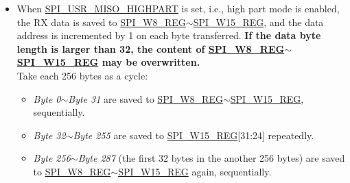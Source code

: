 \documentclass[main\_\_EN.tex]{subfiles}
\begin{document}
\begin{itemize}
\begin{itemize}
        \textbf{For instance:} to receive 258 bytes (\emph{Byte 0}$\sim$\emph{Byte 257}), the data is saved to the registers as follows:
        \begin{itemize}
            \item The first 64 bytes (\emph{Byte 0}$\sim$\emph{Byte 63}) are saved to \hyperref[regdesc:SPIW0REG]{SPI\_W0\_REG}$\sim$\hyperref[regdesc:SPIW15REG]{SPI\_W15\_REG}, sequentially.
            \item \emph{Byte 64}$\sim$\emph{Byte 255} are saved to \hyperref[regdesc:SPIW15REG]{SPI\_W15\_REG}[31:24] repeatedly.
            \item The other bytes (\emph{Byte 256} and \emph{Byte 257}) are saved to \hyperref[regdesc:SPIW0REG]{SPI\_W0\_REG}[7:0] and \hyperref[regdesc:SPIW0REG]{SPI\_W0\_REG}[15:8] again, sequentially. The logic is:
            \begin{itemize}
                \item The address to save \emph{Byte 256} is the result of (256 \% 64 = 0), i.e., \hyperref[regdesc:SPIW0REG]{SPI\_W0\_REG}[7:0].
                \item The address to save \emph{Byte 257} is the result of (257 \% 64 = 1), i.e., \hyperref[regdesc:SPIW0REG]{SPI\_W0\_REG}[15:8].
            \end{itemize}
        \end{itemize}
        
        \item When \hyperref[fielddesc:SPIUSRMISOHIGHPART]{SPI\_USR\_MISO\_HIGHPART} is set, i.e., high part mode is enabled, the RX data is saved to \hyperref[regdesc:SPIW8REG]{SPI\_W8\_REG}$\sim$\hyperref[regdesc:SPIW15REG]{SPI\_W15\_REG}, and the data address is incremented by 1 on each byte transferred. \textbf{If the data byte length is larger than 32, the content of \hyperref[regdesc:SPIW8REG]{SPI\_W8\_REG}$\sim$\hyperref[regdesc:SPIW15REG]{SPI\_W15\_REG} may be overwritten.} \\
        Take each 256 bytes as a cycle:
        \begin{itemize}
            \item \emph{Byte 0}$\sim$\emph{Byte 31} are saved to \hyperref[regdesc:SPIW8REG]{SPI\_W8\_REG}$\sim$\hyperref[regdesc:SPIW15REG]{SPI\_W15\_REG}, sequentially.
            \item \emph{Byte 32}$\sim$\emph{Byte 255} are saved to \hyperref[regdesc:SPIW15REG]{SPI\_W15\_REG}[31:24] repeatedly.
            \item \emph{Byte 256}$\sim$\emph{Byte 287} (the first 32 bytes in the another 256 bytes) are saved to \hyperref[regdesc:SPIW8REG]{SPI\_W8\_REG}$\sim$\hyperref[regdesc:SPIW15REG]{SPI\_W15\_REG} again, sequentially.
        \end{itemize}
        

\end{itemize}
\end{itemize}
\end{document}
